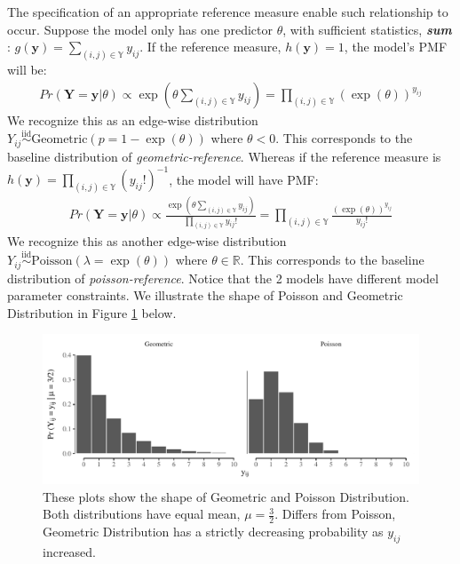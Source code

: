 \documentclass[12pt,a4paper,twoside,openany]{book}\usepackage[]{graphicx}\usepackage[]{color}
\makeatletter
\def\maxwidth{ %
  \ifdim\Gin@nat@width>\linewidth
    \linewidth
  \else
    \Gin@nat@width
  \fi
}
\newenvironment{knitrout}{}{} %
\newcommand{\BI}[1]{\textit{\textbf{#1}}}
\makeatother
\begin{document}
The specification of an appropriate reference measure enable such relationship to occur. 
Suppose the model only has one predictor $\theta$, with sufficient statistics, \BI{sum} : $g(\bm{y}) = \sum_{(i,j) \in \mathbb{Y}} y_{ij}$. 
If the reference measure, $h(\bm{y}) = 1$, the model's PMF will be:
\begin{align}\label{eq: edgewise Geometric}
Pr(\bm{Y}=\bm{y}|\theta) \propto \exp\left(\theta \sum_{(i,j) \in \mathbb{Y}} y_{ij}\right) = \prod_{(i,j) \in \mathbb{Y}} (\exp(\theta))^{y_{ij}}
\end{align} 
We recognize this as an edge-wise distribution $Y_{ij}\stackrel{\text{iid}}{\sim}\text{Geometric}(p =1-\exp(\theta))$ where $\theta < 0$. This corresponds to the baseline distribution of \textit{geometric-reference}. 
Whereas  if the reference measure is $h(\bm{y}) = \prod_{(i,j) \in \mathbb{Y}}(y_{ij}!)^{-1}$, the model will have PMF:
\begin{align}\label{eq: edgewise Poisson}
Pr(\bm{Y}=\bm{y}|\theta) \propto \frac{\exp\left(\theta \sum_{(i,j) \in \mathbb{Y}} y_{ij}\right)}{\prod_{(i,j) \in \mathbb{Y}}y_{ij}!} = \prod_{(i,j) \in \mathbb{Y}} \frac{(\exp(\theta))^{y_{ij}}}{y_{ij}!}
\end{align}
We recognize this as another edge-wise distribution $Y_{ij}\stackrel{\text{iid}}{\sim}\text{Poisson}(\lambda =\exp(\theta))$ where $\theta \in \mathbb{R}$. 
This corresponds to the baseline distribution of \textit{poisson-reference}. 
Notice that the 2 models have different model parameter constraints. 
We illustrate the shape of Poisson and Geometric Distribution in Figure \ref{fig: Geometric and Poisson} below.

\begin{figure}[H] 
\begin{knitrout}
\color{fgcolor}

{\centering \includegraphics[width=\maxwidth]{figure/geom_pois-1} 

}



\end{knitrout}
\caption [Geometric and Poisson Distribution with Mean = 3.5]{These plots show the shape of Geometric and Poisson Distribution. Both distributions have equal mean, $\mu = \frac{3}{2}$. Differs from Poisson, Geometric Distribution has a strictly decreasing probability as $y_{ij}$ increased.}
\label{fig: Geometric and Poisson}
\end{figure}
\end{document}
